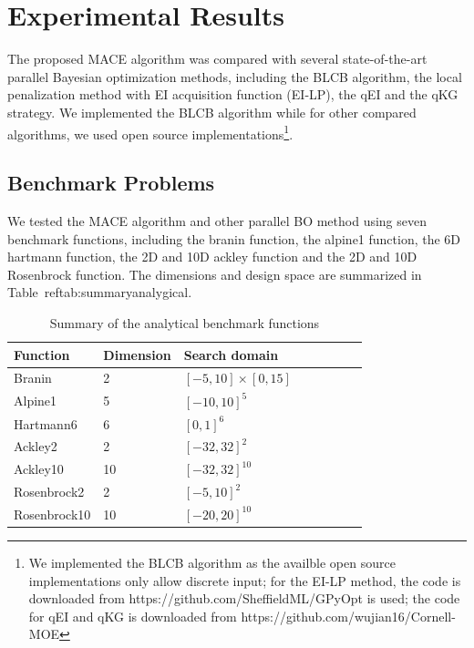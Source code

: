 \section{Experimental Results}


The proposed MACE algorithm was compared with several state-of-the-art parallel
Bayesian optimization methods, including the BLCB algorithm, the local
penalization method with EI acquisition function (EI-LP), the qEI and the qKG
strategy. We implemented the BLCB algorithm while for other compared
algorithms, we used open source implementations\footnote{We implemented the
BLCB algorithm as the availble open source implementations only allow discrete
input; for the EI-LP method, the code is downloaded from
https://github.com/SheffieldML/GPyOpt is used; the code for qEI and qKG is
downloaded from https://github.com/wujian16/Cornell-MOE}.

\subsection{Benchmark Problems}

We tested the MACE algorithm and other parallel BO method using seven benchmark
functions, including the branin function, the alpine1 function, the 6D hartmann
function, the 2D and 10D ackley function and the 2D and 10D Rosenbrock
function. The dimensions and design space are summarized in
Table~ref{tab:summaryanalygical}.

\begin{table}[htbp]
    \centering
    \caption{Summary of the analytical benchmark functions}
    \label{tab:summaryanalygical}
    \begin{tabular}{llllllll}
        \toprule
        Function            & Dimension        & Search domain    \\ \midrule
         Branin             & 2                & $[-5,  10]\times[0, 15]$ \\
         Alpine1            & 5                & $[-10, 10]^5$           \\
         Hartmann6          & 6                & $[0,   1]^6$              \\
         Ackley2            & 2                & $[-32, 32]^2$           \\
         Ackley10           & 10               & $[-32, 32]^{10}$          \\
         Rosenbrock2        & 2                & $[-5,  10]^2$            \\
         Rosenbrock10       & 10               & $[-20, 20]^{10}$          \\
        \bottomrule
    \end{tabular}
\end{table}

